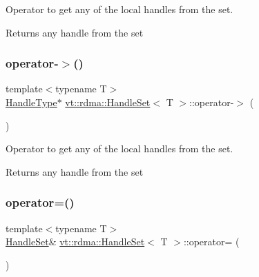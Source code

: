 Operator to get any of the local handles from the set. 

\begin{DoxyReturn}{Returns}
any handle from the set 
\end{DoxyReturn}
\mbox{\label{structvt_1_1rdma_1_1_handle_set_a0f19b37d4a11e43a1ab68710b9d15404}} 
\subsubsection{\texorpdfstring{operator-\/$>$()}{operator->()}}
{\footnotesize\ttfamily template$<$typename T$>$ \\
\hyperlink{structvt_1_1rdma_1_1_handle_set_ab3a698ee86bae503dfa84617205b2dd9}{Handle\+Type}$\ast$ \hyperlink{structvt_1_1rdma_1_1_handle_set}{vt\+::rdma\+::\+Handle\+Set}$<$ T $>$\+::operator-\/$>$ (\begin{DoxyParamCaption}{ }\end{DoxyParamCaption})\hspace{0.3cm}{\ttfamily [inline]}}



Operator to get any of the local handles from the set. 

\begin{DoxyReturn}{Returns}
any handle from the set 
\end{DoxyReturn}
\mbox{\label{structvt_1_1rdma_1_1_handle_set_a9bd23e3b2d2f5d4f7ad5b8dde06da2f8}} 
\subsubsection{\texorpdfstring{operator=()}{operator=()}\hspace{0.1cm}{\footnotesize\ttfamily [1/2]}}
{\footnotesize\ttfamily template$<$typename T$>$ \\
\hyperlink{structvt_1_1rdma_1_1_handle_set}{Handle\+Set}\& \hyperlink{structvt_1_1rdma_1_1_handle_set}{vt\+::rdma\+::\+Handle\+Set}$<$ T $>$\+::operator= (\begin{DoxyParamCaption}\item[{\hyperlink{structvt_1_1rdma_1_1_handle_set}{Handle\+Set}$<$ T $>$ const \&}]{ }\end{DoxyParamCaption})\hspace{0.3cm}{\ttfamily [default]}}

